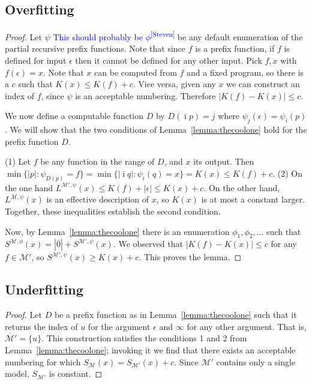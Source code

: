 \documentclass{style/llncs}
\newcommand{\M}{\mathscr M}
\newcommand{\s}{S}
\newcommand{\sdr}[1]{\textcolor{blue}{\small #1\textsuperscript{[Steven]} }}
\begin{document}
\subsection{Overfitting}

\overfitting*

\begin{proof}
Let $\psi$ \sdr{This should probably be $\phi$} be any default enumeration of the partial recursive prefix functions. Note that since $f$ is a prefix function, if $f$ is defined for input $\epsilon$ then it cannot be defined for any other input. Pick $f,x$ with $f(\epsilon)=x$. Note that $x$ can be computed from $f$ and a fixed program, so there is a $c$ such that $K(x)\le K(f)+c$. Vice versa, given any $x$ we can construct an index of $f$, since $\psi$ is an acceptable numbering. Therefore $|K(f)-K(x)|\le c$.

We now define a computable function $D$ by $D(\bar\imath p)=j$ where $\psi_j(\epsilon) = \psi_i(p)$.  We will show that the two conditions of Lemma~\ref{lemma:thecoolone} hold for the prefix function $D$.

(1) Let $f$ be any function in the range of $D$, and $x$ its output. Then $\min\{|p|:\psi_{D(p)}=f\}=\min\{|\bar\imath q|:\psi_i(q)=x\}=K(x)\le K(f)+c$. (2) On the one hand $L^{\M',\psi}(x)\le K(f)+|\epsilon|\le K(x)+c$. On the other hand, $L^{\M,\psi}(x)$ is an effective description of $x$, so $K(x)$ is at most a constant larger. Together, these inequalities establish the second condition.

Now, by Lemma~\ref{lemma:thecoolone} there is an enumeration $\phi_1,\phi_2,\ldots$ such that $S^{\M,\phi}(x)=|\bar 0|+S^{\M',\psi}(x)$. We observed that $|K(f)-K(x)|\le c$ for any $f\in\M'$, so $S^{\M',\psi}(x)\ge K(x)+c$. This proves the lemma.
\end{proof}
\subsection{Underfitting}

\underfitting*

\begin{proof}
Let $D$ be a prefix function as in Lemma~\ref{lemma:thecoolone} such that it returns the index of $u$ for the argument $\epsilon$ and $\infty$ for any other argument. That is, $\M' = \{u\}$. This construction satisfies the conditions 1 and 2 from Lemma~\ref{lemma:thecoolone}; invoking it we find that there exists an acceptable numbering for which $\s_\M(x) = \s_{\M'}(x) + c$. Since $\M'$ contains only a single model, $\s_{\M'}$ is constant.
\end{proof}
\end{document}
